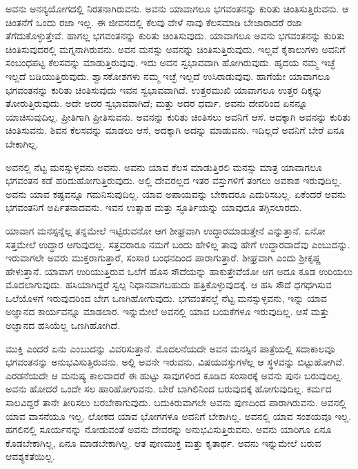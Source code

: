 ಅವನು ಅನನ್ಯಯೋಗದಲ್ಲಿ ನಿರತನಾಗಿರುವನು. ಅವನು ಯಾವಾಗಲೂ ಭಗವಂತನನ್ನು ಕುರಿತು ಚಿಂತಿಸುತ್ತಿರುವನು. ಆ ಚಿಂತನೆಗೆ ಒಂದು ರಜಾ ಇಲ್ಲ. ಈ ಜೀವನದಲ್ಲಿ ಕೆಲವು ವೇಳೆ ನಾವು ಕೆಲಸಮಾಡಿ ಬೇಜಾರಾದರೆ ರಜಾ ತೆಗೆದುಕೊಳ್ಳುತ್ತೇವೆ. ಹಾಗಲ್ಲ ಭಗವಂತನನ್ನು ಕುರಿತು ಚಿಂತಿಸುವುದು. ಯಾವಾಗಲೂ ಅವನು ಭಗವಂತನನ್ನು ಕುರಿತು ಚಿಂತಿಸುವುದರಲ್ಲಿ ಮಗ್ನನಾಗಿರುವನು. ಅವನ ಮನಸ್ಸು ಅವನನ್ನು ಚಿಂತಿಸುತ್ತಿರುವುದು. ಇಲ್ಲವೆ ಕೈಕಾಲುಗಳು ಅವನಿಗೆ ಸಂಬಂಧಪಟ್ಟ ಕೆಲಸವನ್ನು ಮಾಡುತ್ತಿರುವುವು. ಇದು ಅವನ ಸ್ವಭಾವವಾಗಿ ಹೋಗಿರುವುದು. ಹೃದಯ ನಮ್ಮ ಇಚ್ಛೆ ಇಲ್ಲದೆ ಬಡಿಯುತ್ತಿರುವುದು. ಶ್ವಾಸಕೋಶಗಳು ನಮ್ಮ ಇಚ್ಛೆ ಇಲ್ಲದೆ ಉಸಿರಾಡುವುವು. ಹಾಗೆಯೇ ಯಾವಾಗಲೂ ಭಗವಂತನನ್ನು ಕುರಿತು ಚಿಂತಿಸುವುದು ಇವನ ಸ್ವಭಾವವಾಗಿದೆ. ಉತ್ತರಮುಖಿ ಯಾವಾಗಲೂ ಉತ್ತರ ದಿಕ್ಕನ್ನು ತೋರುತ್ತಿರುವುದು. ಅದೇ ಅದರ ಸ್ವಭಾವವಾಗಿದೆ; ಮತ್ತು ಅದರ ಧರ್ಮ. ಅವನು ದೇವರಿಂದ ಏನನ್ನೂ ಯಾಚಿಸುವುದಿಲ್ಲ. ಪ್ರೀತಿಗಾಗಿ ಪ್ರೀತಿಸುವನು. ಅವನನ್ನು ಕುರಿತು ಚಿಂತಿಸಲು ಅವನಿಗೆ ಆಸೆ. ಅದಕ್ಕಾಗಿ ಅವನನ್ನು ಕುರಿತು ಚಿಂತಿಸುವನು. ಶಿವನ ಕೆಲಸವನ್ನು ಮಾಡಲು ಆಸೆ, ಅದಕ್ಕಾಗಿ ಅದನ್ನು ಮಾಡುವನು. ಇದಿಲ್ಲದೆ ಅವನಿಗೆ ಬೇರೆ ಏನೂ ಬೇಕಾಗಿಲ್ಲ.

ಅವನಲ್ಲಿ ನೆಟ್ಟ ಮನಸ್ಸುಳ್ಳವನು ಅವನು. ಅವನು ಯಾವ ಕೆಲಸ ಮಾಡುತ್ತಿರಲಿ ಮನಸ್ಸು ಮಾತ್ರ ಯಾವಾಗಲೂ ಭಗವಂತನ ಕಡೆ ಹರಿದುಹೋಗುತ್ತಿರುವುದು. ಅಲ್ಲಿ ದೇವರಲ್ಲದ ಇತರ ವಸ್ತುಗಳಿಗೆ ತಂಗಲು ಅವಕಾಶ ಇರುವುದಿಲ್ಲ. ಅವನು ಯಾವ ಕಷ್ಟವನ್ನೂ ಗಮನಿಸುವುದಿಲ್ಲ. ಯಾವ ಅಪಾಯವನ್ನು ಬೇಕಾದರೂ ಎದುರಿಸಬಲ್ಲ. ಏಕೆಂದರೆ ಅವನು ಭಗವಂತನಿಗೆ ಅರ್ಪಿತ\-ನಾದವನು. ಇವನ ಉತ್ಸಾಹ ಮತ್ತು ಸ್ಫೂರ್ತಿಯನ್ನು ಯಾವುದೂ ತಗ್ಗಿಸಲಾರದು.

ಯಾವಾಗ ಮನಸ್ಸನ್ನೆಲ್ಲ ತನ್ನಮೇಲೆ ಇಟ್ಟಿರುವನೋ ಆಗ ಶೀಘ್ರವಾಗಿ ಉದ್ಧಾರಮಾಡುತ್ತೇನೆ ಎನ್ನುತ್ತಾನೆ. ಏನೋ ಸತ್ತಮೇಲೆ ಉದ್ಧಾರ ಆಗುವುದಲ್ಲ. ಸತ್ತವರಾರೂ ನಮಗೆ ಬಂದು ಹೇಳಿಲ್ಲ ತಾವು ಹೇಗೆ ಉದ್ಧಾರವಾದೆವು ಎಂಬುದನ್ನು. ಇರುವಾಗಲೇ ಅವರು ಮುಕ್ತರಾಗುತ್ತಾರೆ, ಸಂಸಾರ ಬಂಧನದಿಂದ ಪಾರಾಗುತ್ತಾರೆ. ಶೀಘ್ರವಾಗಿ ಎಂದು ಶ‍್ರೀಕೃಷ್ಣ ಹೇಳುತ್ತಾನೆ. ಯಾವಾಗ ಉರಿಯುತ್ತಿರುವ ಒಲೆಗೆ ಹೊಸ ಸೌದೆಯನ್ನು ಹಾಕುತ್ತೇವೆಯೋ ಆಗ ಅದೂ ಕೂಡ ಉರಿಯಲು ಮೊದಲಾಗುವುದು. ಹಸಿಯಾಗಿದ್ದರೆ ಸ್ವಲ್ಪ ನಿಧಾನವಾಗಬಹುದು ಹತ್ತಿಕೊಳ್ಳುವುದಕ್ಕೆ. ಆ ಹಸಿ ಸೌದೆ ಧಗಧಗಿಸುವ ಒಲೆಯೊಳಗೆ ಇರುವುದರಿಂದ ಬೇಗ ಒಣಗಿಹೋಗುವುದು. ಭಗವಂತನಲ್ಲೆ ನೆಟ್ಟ ಮನಸ್ಸುಳ್ಳವನು, ಇನ್ನು ಯಾವ ಅಜ್ಞಾನದ ಕಾರ್ಯವನ್ನೂ ಮಾಡಲಾರ. ಇನ್ನುಮೇಲೆ ಅವನಲ್ಲಿ ಯಾವ ಬಯಕೆಗಳೂ ಇರುವುದಿಲ್ಲ. ಆಸೆ ಮತ್ತು ಅಜ್ಞಾನದ ಹಸಿಯೆಲ್ಲ ಒಣಗಿಹೋಗಿದೆ.

ಮುಕ್ತಿ ಎಂದರೆ ಏನು ಎಂಬುದನ್ನು ವಿವರಿಸುತ್ತಾನೆ. ಮೊದಲನೆಯದೇ ಅವನ ಮನಸ್ಸಿನ ಪಾತ್ರೆಯಲ್ಲಿ ಸದಾಕಾಲವೂ ಭಗವಂತನನ್ನು ಅನುಭವಿಸುತ್ತಿರುವನು. ಅಲ್ಲಿ ಅವನೇ ಇರುವನು. ವಿಷಯವಸ್ತುಗಳೆಲ್ಲ ಆ ಸ್ಥಳವನ್ನು ಬಿಟ್ಟುಹೋಗಿವೆ. ಎರಡನೆಯದೇ ಆ ಮನುಷ್ಯ ಕಾಲವಾದರೆ ಈ ಹುಟ್ಟು ಸಾವುಗಳಿಂದ ಕೂಡಿದ ಸಂಸಾರಕ್ಕೆ ಅವನು ಪುನಃ ಬರುವುದಿಲ್ಲ. ಅವನು ಹೋದರೆ ಒಂದೇ ಸಲ ಹಾರಿಹೋಗುವನು. ಬೇರೆ ಬಾಗಿಲಿನಿಂದ ಬರುವುದಕ್ಕೆ ಹೋಗುವುದಿಲ್ಲ. ಕರ್ಮದ ಸಾಲವಿದ್ದರೆ ತಾನೇ ತೀರಿಸಲು ಬರಬೇಕಾಗುವುದು. ಬದುಕಿರುವಾಗಲೇ ಅವನು ಪುಣದಿಂದ ಪಾರಾಗಿರುವನು. ಅವನಲ್ಲಿ ಯಾವ ವಾಸನೆಯೂ ಇಲ್ಲ. ಲೋಕದ ಯಾವ ಭೋಗಗಳೂ ಅವನಿಗೆ ಬೇಕಾಗಿಲ್ಲ. ಅವನಲ್ಲಿ ಯಾವ ಸಂಶಯವೂ ಇಲ್ಲ. ಹಗಲಿನಲ್ಲಿ ಸೂರ್ಯನನ್ನು ನೋಡುವಂತೆ ಅವನು ದೇವರನ್ನು ಅನುಭವಿಸುತ್ತಿರುವನು. ಅವನು ಯಾರಿಗೂ ಏನೂ ಕೊಡಬೇಕಾಗಿಲ್ಲ, ಏನೂ ಮಾಡಬೇಕಾಗಿಲ್ಲ. ಆತ ಪುಣಮುಕ್ತ ಮತ್ತು ಕೃತಾರ್ಥ. ಅವನು ಇನ್ನುಮೇಲೆ ಬರುವ ಆವಶ್ಯಕತೆಯಿಲ್ಲ.

